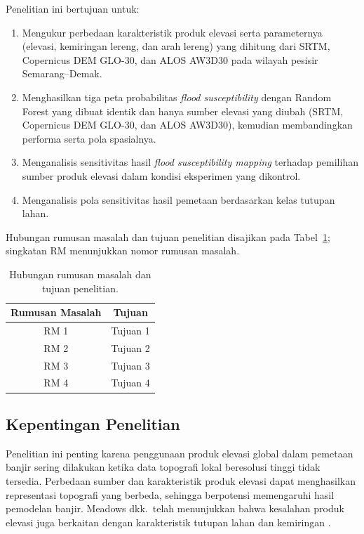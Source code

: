 \documentclass[12pt]{article}
\begin{document}
Penelitian ini bertujuan untuk:

\begin{enumerate}
\item Mengukur perbedaan karakteristik produk elevasi serta parameternya
(elevasi, kemiringan lereng, dan arah lereng) yang dihitung dari SRTM,
Copernicus DEM GLO-30, dan ALOS AW3D30 pada wilayah pesisir
Semarang--Demak.
\item Menghasilkan tiga peta probabilitas \textit{flood susceptibility}
dengan Random Forest yang dibuat identik dan hanya sumber elevasi yang
diubah (SRTM, Copernicus DEM GLO-30, dan ALOS AW3D30), kemudian
membandingkan performa serta pola spasialnya.
\item Menganalisis sensitivitas hasil \textit{flood susceptibility mapping}
terhadap pemilihan sumber produk elevasi dalam kondisi eksperimen yang
dikontrol.
\item Menganalisis pola sensitivitas hasil pemetaan berdasarkan kelas
tutupan lahan.
\end{enumerate}

Hubungan rumusan masalah dan tujuan penelitian disajikan pada
Tabel~\ref{tab:rm-tujuan}; singkatan RM menunjukkan nomor rumusan masalah.

\begin{table}[ht]
\centering
\caption{Hubungan rumusan masalah dan tujuan penelitian.}
\label{tab:rm-tujuan}
\begin{tabular}{cc}
\toprule
\textbf{Rumusan Masalah} & \textbf{Tujuan} \\
\midrule
RM 1 & Tujuan 1 \\
RM 2 & Tujuan 2 \\
RM 3 & Tujuan 3 \\
RM 4 & Tujuan 4 \\
\bottomrule
\end{tabular}
\end{table}

\subsection{Kepentingan Penelitian}

Penelitian ini penting karena penggunaan produk elevasi global dalam
pemetaan banjir sering dilakukan ketika data topografi lokal beresolusi
tinggi tidak tersedia. Perbedaan sumber dan karakteristik produk elevasi
dapat menghasilkan representasi topografi yang berbeda, sehingga berpotensi
memengaruhi hasil pemodelan banjir. Meadows dkk.\ telah menunjukkan bahwa
kesalahan produk elevasi juga berkaitan dengan karakteristik tutupan lahan
dan kemiringan \cite{meadows2024}.
\end{document}
